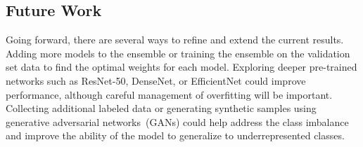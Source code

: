 \subsection{Future Work}%

Going forward, there are several ways to refine and extend the current results. Adding more models to the ensemble or training the ensemble on the validation set data to find the optimal weights for each model. Exploring deeper pre-trained networks such as ResNet-50, DenseNet, or EfficientNet could improve performance, although careful management of overfitting will be important. Collecting additional labeled data or generating synthetic samples using generative adversarial networks~(GANs) could help address the class imbalance and improve the ability of the model to generalize to underrepresented classes.
